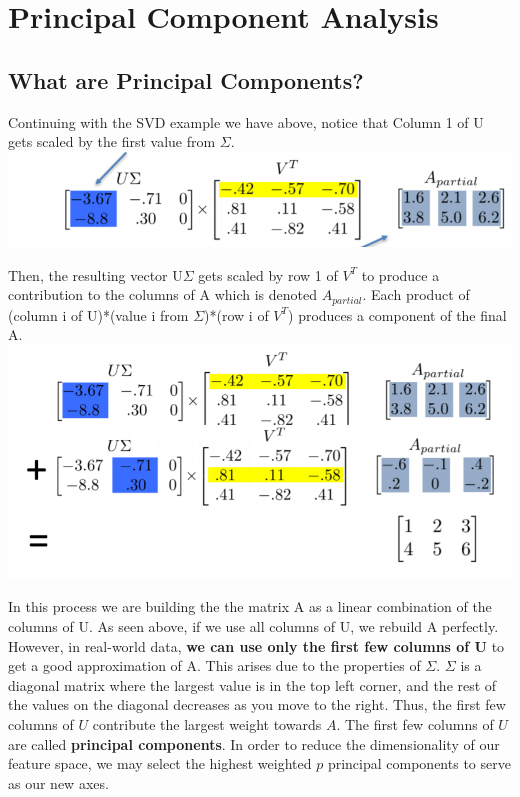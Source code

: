 \documentclass{article}
\begin{document}
\section{Principal Component Analysis}

\subsection{What are Principal Components?}
Continuing with the SVD example we have above, notice that Column 1 of U gets scaled by the first value from $\Sigma$.\\

\includegraphics[scale = 0.5]{Usig}

Then, the resulting vector U$\Sigma$ gets scaled by row 1 of $V^T$ to produce a contribution to the columns of A which is denoted $A_{partial}$. Each product of (column i of U)*(value i from $\Sigma$)*(row i of $V^T$) produces a component of the final A.\\

\includegraphics[scale = 0.5]{full_pca}

In this process we are building the the matrix A as a linear combination of the columns of U. As seen above, if we use all columns of U, we rebuild A perfectly. However, in real-world data, \textbf{we can use only the first few columns of U} to get a good approximation of A. This arises due to the properties of $\Sigma$. $\Sigma$ is a diagonal matrix where the largest value is in the top left corner, and the rest of the values on the diagonal decreases as you move to the right. Thus, the first few columns of $U$ contribute the largest weight towards $A$. The first few columns of $U$ are called \textbf{principal components}. In order to reduce the dimensionality of our feature space, we may select the highest weighted $p$ principal components to serve as our new axes.\\
\end{document}
